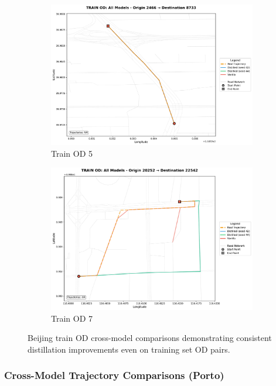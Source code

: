 \begin{figure}[H]
\begin{subfigure}{0.49\linewidth}
        \includegraphics[width=\linewidth]{assets/plots/eval/beijing/cross_model/train_od_comparison_5_origin2466_dest8733.pdf}
        \caption{Train OD 5}
    \end{subfigure}
    \begin{subfigure}{0.49\linewidth}
        \centering
        \includegraphics[width=\linewidth]{assets/plots/eval/beijing/cross_model/train_od_comparison_7_origin20252_dest22542.pdf}
        \caption{Train OD 7}
    \end{subfigure}
    \caption{Beijing train OD cross-model comparisons demonstrating consistent distillation improvements even on training set OD pairs.}
    \label{fig:appendix-beijing-cross-train}
\end{figure}

\subsubsection{Cross-Model Trajectory Comparisons (Porto)}
\label{app:cross-model-porto}

